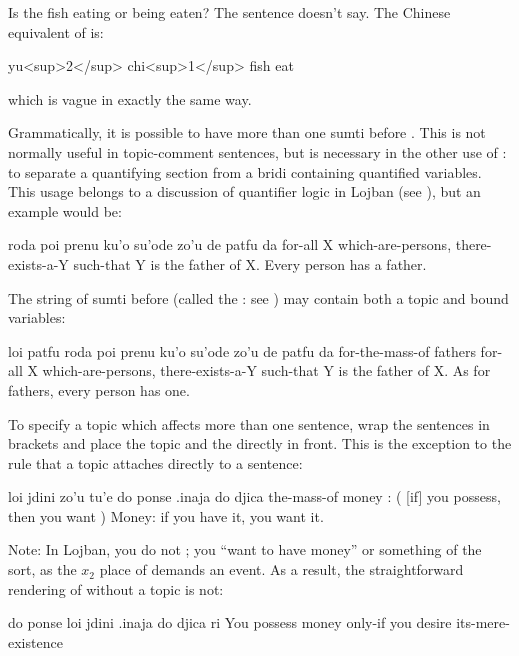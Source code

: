 Is the fish eating or being eaten? The sentence doesn't say.
    The Chinese equivalent of 
    is:
\begin{example}
yu<sup>2</sup> chi<sup>1</sup>\n
fish   eat
\end{example}

{\noindent}which is vague in exactly the same way. 

Grammatically, it is possible to have more than one sumti
    before . This is not normally useful in topic-comment
    sentences, but is necessary in the other use of : to
    separate a quantifying section from a bridi containing
    quantified variables. This usage belongs to a discussion of
    quantifier logic in Lojban (see ), but an example would be:
\begin{example}
roda poi prenu ku'o su'ode zo'u\n
\T	de patfu da\n
for-all X which-are-persons, there-exists-a-Y such-that\n
\T	Y is the father of X.\n
Every person has a father.
\end{example}

The string of sumti before  (called the :
    see ) may contain both a
    topic and bound variables:
\begin{example}
loi patfu\n
\T	roda poi prenu ku'o su'ode zo'u\n
\T	de patfu da\n
for-the-mass-of fathers\n
\T	for-all X which-are-persons, there-exists-a-Y such-that\n
\T	Y is the father of X.\n
As for fathers, every person has one.
\end{example}

To specify a topic which affects more than one sentence, wrap
    the sentences in  brackets and place the topic
    and the  directly in front. This is the exception to
    the rule that a topic attaches directly to a sentence:
\begin{example}
loi jdini zo'u tu'e do ponse .inaja do djica \n
the-mass-of money :  ( [if] you possess, then you want )\n
Money: if you have it, you want it.
\end{example}

Note: In Lojban, you do not ; you ``want to
    have money'' or something of the sort, as the $x_2$ place of
     demands an event. As a result, the straightforward
    rendering of  without a topic is
    not:
\begin{example}
do ponse loi jdini .inaja do djica ri\n
You possess money only-if you desire its-mere-existence
\end{example}

